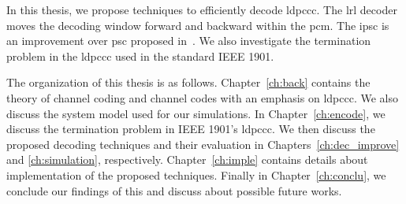 In this thesis, we propose techniques to efficiently decode \gls{ldpccc}. The \gls{lrl} decoder moves the decoding window forward and backward within the \gls{pcm}. The \gls{ipsc} is an improvement over \gls{psc} proposed in~\cite{Kang2018}. We also investigate the termination problem in the \gls{ldpccc} used in the standard IEEE 1901.

The organization of this thesis is as follows. Chapter~\ref{ch:back} contains the theory of channel coding and channel codes with an emphasis on \gls{ldpccc}. We also discuss the system model used for our simulations. In Chapter~\ref{ch:encode}, we discuss the termination problem in IEEE 1901's \gls{ldpccc}. We then discuss the proposed decoding techniques and their evaluation in Chapters~\ref{ch:dec_improve} and \ref{ch:simulation}, respectively. Chapter~\ref{ch:imple} contains details about implementation of the proposed techniques. Finally in Chapter~\ref{ch:conclu}, we conclude our findings of this and discuss about possible future works.